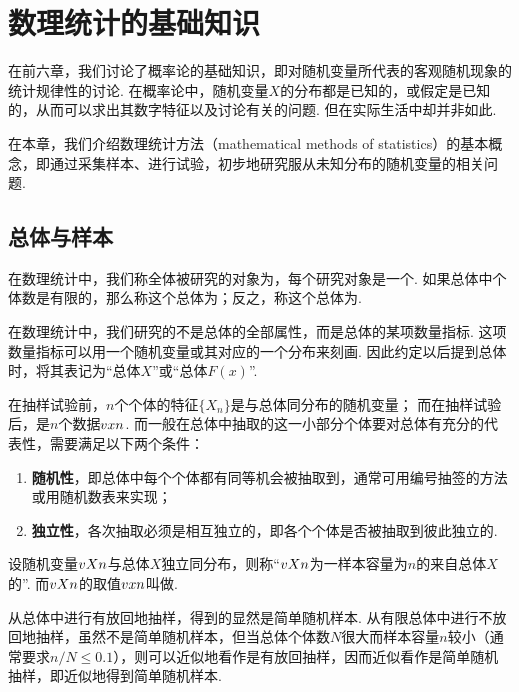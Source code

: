 \chapter{数理统计的基础知识}
在前六章，我们讨论了概率论的基础知识，即对随机变量所代表的客观随机现象的统计规律性的讨论.
在概率论中，随机变量\(X\)的分布都是已知的，或假定是已知的，从而可以求出其数字特征以及讨论有关的问题.
但在实际生活中却并非如此.

在本章，我们介绍数理统计方法（mathematical methods of statistics）的基本概念，即通过采集样本、进行试验，初步地研究服从未知分布的随机变量的相关问题.

\section{总体与样本}
\begin{definition}
在数理统计中，我们称全体被研究的对象为，每个研究对象是一个.
如果总体中个体数是有限的，那么称这个总体为；反之，称这个总体为.
\end{definition}

在数理统计中，我们研究的不是总体的全部属性，而是总体的某项数量指标.
这项数量指标可以用一个随机变量或其对应的一个分布来刻画.
因此约定以后提到总体时，将其表记为“总体\(X\)”或“总体\(F(x)\)”.

在抽样试验前，\(n\)个个体的特征\(\{X_n\}\)是与总体同分布的随机变量；
而在抽样试验后，是\(n\)个数据\(v{x}{n}\).
而一般在总体中抽取的这一小部分个体要对总体有充分的代表性，需要满足以下两个条件：
\begin{enumerate}
\item {\bf 随机性}，即总体中每个个体都有同等机会被抽取到，通常可用编号抽签的方法或用随机数表来实现；
\item {\bf 独立性}，各次抽取必须是相互独立的，即各个个体是否被抽取到彼此独立的.
\end{enumerate}

\begin{definition}
设随机变量\(v{X}{n}\)与总体\(X\)独立同分布，则称“\(v{X}{n}\)为一样本容量为\(n\)的来自总体\(X\)的”.
而\(v{X}{n}\)的取值\(v{x}{n}\)叫做.
\end{definition}

从总体中进行有放回地抽样，得到的显然是简单随机样本.
从有限总体中进行不放回地抽样，虽然不是简单随机样本，但当总体个体数\(N\)很大而样本容量\(n\)较小（通常要求\(n/N \leqslant 0.1\)），则可以近似地看作是有放回抽样，因而近似看作是简单随机抽样，即近似地得到简单随机样本.

